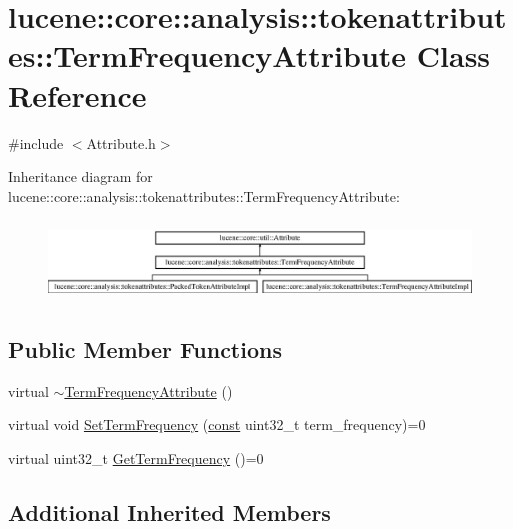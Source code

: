 \hypertarget{classlucene_1_1core_1_1analysis_1_1tokenattributes_1_1TermFrequencyAttribute}{}\section{lucene\+:\+:core\+:\+:analysis\+:\+:tokenattributes\+:\+:Term\+Frequency\+Attribute Class Reference}
\label{classlucene_1_1core_1_1analysis_1_1tokenattributes_1_1TermFrequencyAttribute}


{\ttfamily \#include $<$Attribute.\+h$>$}

Inheritance diagram for lucene\+:\+:core\+:\+:analysis\+:\+:tokenattributes\+:\+:Term\+Frequency\+Attribute\+:\begin{figure}[H]
\begin{center}
\leavevmode
\includegraphics[height=2.137405cm]{classlucene_1_1core_1_1analysis_1_1tokenattributes_1_1TermFrequencyAttribute}
\end{center}
\end{figure}
\subsection*{Public Member Functions}
\begin{DoxyCompactItemize}
\item 
virtual \mbox{\hyperlink{classlucene_1_1core_1_1analysis_1_1tokenattributes_1_1TermFrequencyAttribute_aeb43d01255010bab6bcbf05e74d87d7e}{$\sim$\+Term\+Frequency\+Attribute}} ()
\item 
virtual void \mbox{\hyperlink{classlucene_1_1core_1_1analysis_1_1tokenattributes_1_1TermFrequencyAttribute_aeb8ef8cc3f3ab6c8678b491ac3e1b682}{Set\+Term\+Frequency}} (\mbox{\hyperlink{ZlibCrc32_8h_a2c212835823e3c54a8ab6d95c652660e}{const}} uint32\+\_\+t term\+\_\+frequency)=0
\item 
virtual uint32\+\_\+t \mbox{\hyperlink{classlucene_1_1core_1_1analysis_1_1tokenattributes_1_1TermFrequencyAttribute_a2ddffa369215ac61e2eadbab087f5d74}{Get\+Term\+Frequency}} ()=0
\end{DoxyCompactItemize}
\subsection*{Additional Inherited Members}


